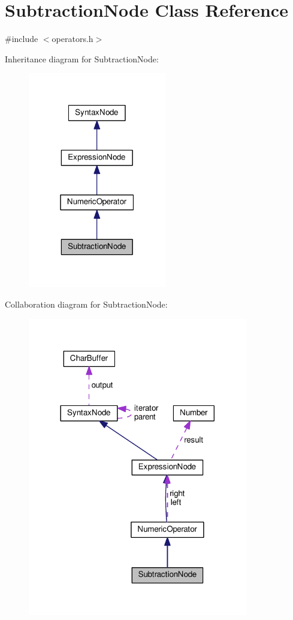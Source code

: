 \hypertarget{classSubtractionNode}{}\section{Subtraction\+Node Class Reference}
\label{classSubtractionNode}


{\ttfamily \#include $<$operators.\+h$>$}



Inheritance diagram for Subtraction\+Node\+:\nopagebreak
\begin{figure}[H]
\begin{center}
\leavevmode
\includegraphics[width=171pt]{classSubtractionNode__inherit__graph}
\end{center}
\end{figure}


Collaboration diagram for Subtraction\+Node\+:\nopagebreak
\begin{figure}[H]
\begin{center}
\leavevmode
\includegraphics[width=272pt]{classSubtractionNode__coll__graph}
\end{center}
\end{figure}
